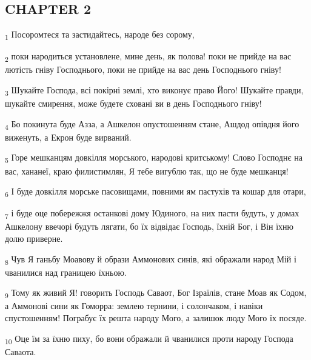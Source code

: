 \subsection{CHAPTER 2}
\begin{tcolorbox}
\textsubscript{1} Посоромтеся та застидайтесь, народе без сорому,
\end{tcolorbox}
\begin{tcolorbox}
\textsubscript{2} поки народиться установлене, мине день, як полова! поки не прийде на вас лютість гніву Господнього, поки не прийде на вас день Господнього гніву!
\end{tcolorbox}
\begin{tcolorbox}
\textsubscript{3} Шукайте Господа, всі покірні землі, хто виконує право Його! Шукайте правди, шукайте смирення, може будете сховані ви в день Господнього гніву!
\end{tcolorbox}
\begin{tcolorbox}
\textsubscript{4} Бо покинута буде Азза, а Ашкелон опустошенням стане, Ашдод опівдня його виженуть, а Екрон буде вирваний.
\end{tcolorbox}
\begin{tcolorbox}
\textsubscript{5} Горе мешканцям довкілля морського, народові критському! Слово Господнє на вас, хананеї, краю филистимлян, Я тебе вигублю так, що не буде мешканця!
\end{tcolorbox}
\begin{tcolorbox}
\textsubscript{6} І буде довкілля морське пасовищами, повними ям пастухів та кошар для отари,
\end{tcolorbox}
\begin{tcolorbox}
\textsubscript{7} і буде оце побережжя останкові дому Юдиного, на них пасти будуть, у домах Ашкелону ввечорі будуть лягати, бо їх відвідає Господь, їхній Бог, і Він їхню долю приверне.
\end{tcolorbox}
\begin{tcolorbox}
\textsubscript{8} Чув Я ганьбу Моавову й образи Аммонових синів, які ображали народ Мій і чванилися над границею їхньою.
\end{tcolorbox}
\begin{tcolorbox}
\textsubscript{9} Тому як живий Я! говорить Господь Саваот, Бог Ізраїлів, стане Моав як Содом, а Аммонові сини як Гоморра: землею тернини, і солончаком, і навіки спустошенням! Пограбує їх решта народу Мого, а залишок люду Мого їх посяде.
\end{tcolorbox}
\begin{tcolorbox}
\textsubscript{10} Оце їм за їхню пиху, бо вони ображали й чванилися проти народу Господа Саваота.
\end{tcolorbox}
